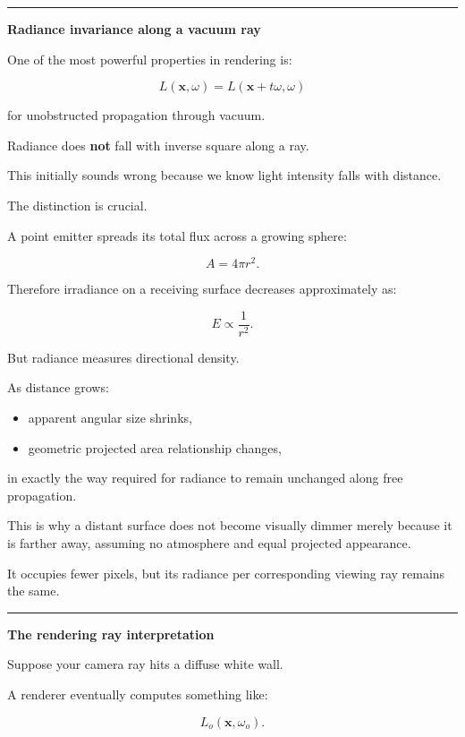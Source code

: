 \begin{center}\rule{0.5\linewidth}{0.5pt}\end{center}

\textbf{Radiance invariance along a vacuum ray}

One of the most powerful properties in rendering is:

\[
\boxed{
L(\mathbf x,\omega)
=
L(\mathbf x+t\omega,\omega)
}
\]

for unobstructed propagation through vacuum.

Radiance does \textbf{not} fall with inverse square along a ray.

This initially sounds wrong because we know light intensity falls with distance.

The distinction is crucial.

A point emitter spreads its total flux across a growing sphere:

\[
A=4\pi r^2.
\]

Therefore irradiance on a receiving surface decreases approximately as:

\[
E\propto\frac1{r^2}.
\]

But radiance measures directional density.

As distance grows:

\begin{itemize}
\tightlist
\item
  apparent angular size shrinks,
\item
  geometric projected area relationship changes,
\end{itemize}

in exactly the way required for radiance to remain unchanged along free propagation.

This is why a distant surface does not become visually dimmer merely because it is farther away, assuming no atmosphere and equal projected appearance.

It occupies fewer pixels, but its radiance per corresponding viewing ray remains the same.

\begin{center}\rule{0.5\linewidth}{0.5pt}\end{center}

\textbf{The rendering ray interpretation}

Suppose your camera ray hits a diffuse white wall.

A renderer eventually computes something like:

\[
L_o(\mathbf x,\omega_o).
\]

